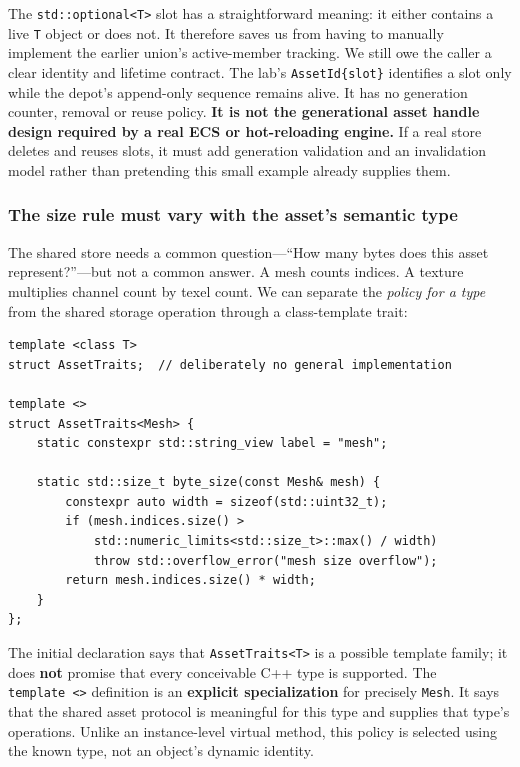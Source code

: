 The \texttt{std::optional\textless{}T\textgreater{}} slot has a straightforward meaning: it either contains a live \texttt{T} object or does not. It therefore saves us from having to manually implement the earlier union's active-member tracking. We still owe the caller a clear identity and lifetime contract. The lab's \texttt{AssetId\{slot\}} identifies a slot only while the depot's append-only sequence remains alive. It has no generation counter, removal or reuse policy. \textbf{It is not the generational asset handle design required by a real ECS or hot-reloading engine.} If a real store deletes and reuses slots, it must add generation validation and an invalidation model rather than pretending this small example already supplies them.

\subsubsection{The size rule must vary with the asset's semantic type}\label{the-size-rule-must-vary-with-the-assets-semantic-type}

The shared store needs a common question---``How many bytes does this asset represent?''---but not a common answer. A mesh counts indices. A texture multiplies channel count by texel count. We can separate the \emph{policy for a type} from the shared storage operation through a class-template trait:

\begin{verbatim}
template <class T>
struct AssetTraits;  // deliberately no general implementation

template <>
struct AssetTraits<Mesh> {
    static constexpr std::string_view label = "mesh";

    static std::size_t byte_size(const Mesh& mesh) {
        constexpr auto width = sizeof(std::uint32_t);
        if (mesh.indices.size() >
            std::numeric_limits<std::size_t>::max() / width)
            throw std::overflow_error("mesh size overflow");
        return mesh.indices.size() * width;
    }
};
\end{verbatim}

The initial declaration says that \texttt{AssetTraits\textless{}T\textgreater{}} is a possible template family; it does \textbf{not} promise that every conceivable C++ type is supported. The \texttt{template\ \textless{}\textgreater{}} definition is an \textbf{explicit specialization} for precisely \texttt{Mesh}. It says that the shared asset protocol is meaningful for this type and supplies that type's operations. Unlike an instance-level virtual method, this policy is selected using the known type, not an object's dynamic identity.

